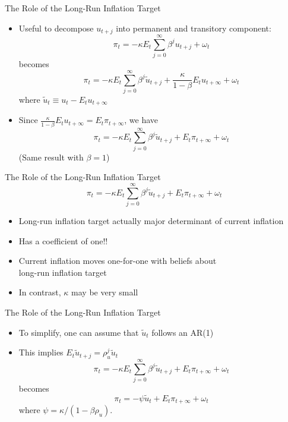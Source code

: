 \documentclass[11pt,aspectratio=169,xcolor={dvipsnames},hyperref={pdftex,pdfpagemode=UseNone,hidelinks,pdfdisplaydoctitle=true},usepdftitle=false]{beamer}
\begin{document}
\begin{frame}{The Role of the Long-Run Inflation Target}
	\begin{itemize}
		\item Useful to decompose $u_{t+j}$ into permanent and transitory component:
		\[\pi_{t}=-\kappa E_{t}\sum_{j=0}^{\infty}\beta^{j} u_{t+j} + \omega_{t}\]
		becomes
		\[\pi_{t}=-\kappa E_{t}\sum_{j=0}^{\infty}\beta^{j}\tilde{u}_{t+j} + \frac{\kappa}{1-\beta}E_{t} u_{t+\infty} + \omega_{t}\]
		where $\tilde{u}_{t}\equiv u_{t}- E_{t}u_{t+\infty}$
		\item Since $\frac{\kappa}{1-\beta} E_{t}u_{t+\infty}=E_{t}\pi_{t+\infty}$, we have
		\[\pi_{t}=-\kappa E_{t}\sum_{j=0}^{\infty}\beta^{j}\tilde{u}_{t+j} + E_{t}\pi_{t+\infty} + \omega_{t}\]
		(Same result with $\beta = 1$)
	\end{itemize}
\end{frame}


\begin{frame}{The Role of the Long-Run Inflation Target}
	\[\pi_{t}=-\kappa E_{t}\sum_{j=0}^{\infty}\beta^{j}\tilde{u}_{t+j} + E_{t}\pi_{t+\infty} + \omega_{t}\]
		\begin{itemize}
		\itemsep1em 
		\item Long-run inflation target actually major determinant of current inflation
		\item Has a coefficient of one!!
		\item Current inflation moves one-for-one with beliefs about \\ long-run inflation target
		\item In contrast, $\kappa$ may be very small
	\end{itemize}
\end{frame}


\begin{frame}{The Role of the Long-Run Inflation Target}
	\begin{itemize}
		\itemsep1em 
		\item To simplify, one can assume that $\tilde{u}_t$ follows an AR(1)
		\item This implies $E_t \tilde{u}_{t+j} = \rho^j_u \tilde{u}_{t}$
		\[\pi_{t}=-\kappa E_{t}\sum_{j=0}^{\infty}\beta^{j}\tilde{u}_{t+j} + E_{t}\pi_{t+\infty} + \omega_{t}\]
		becomes
		\[ \pi_{t} = - \psi \tilde{u}_{t} + E_{t}\pi_{t+\infty} + \omega_t\]
		where $\psi = \kappa / (1-\beta\rho_{u})$. 
	\end{itemize}
\end{frame}
\end{document}
